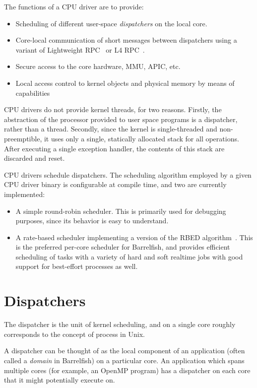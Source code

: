 \documentclass[a4paper,twoside]{report} %
\begin{document}
The functions of a CPU driver are to provide:
\begin{itemize}
\item Scheduling of different user-space \textit{dispatchers} on the
  local core.
\item Core-local communication of short messages between dispatchers
  using a variant of Lightweight RPC~\cite{lrpc:tocs90} or L4
  RPC~\cite{Liedtke:1993:IIK:168619.168633}. 
\item Secure access to the core hardware, MMU, APIC, etc.
\item Local access control to kernel objects and physical memory by
  means of capabilities
\end{itemize}

CPU drivers do not provide kernel threads, for two reasons.  Firstly,
the abstraction of the processor provided to user space programs is a
dispatcher, rather than a thread.  Secondly, since the kernel is
single-threaded and non-preemptible, it uses only a single, statically
allocated stack for all operations. After executing a single exception
handler, the contents of this stack are discarded and reset. 

CPU drivers schedule dispatchers.  The scheduling algorithm employed
by a given CPU driver binary is configurable at compile time, and two
are currently implemented:
\begin{itemize}
\item A simple round-robin scheduler.  This is primarily used for
  debugging purposes, since its behavior is easy to understand.
\item A rate-based scheduler implementing a version of the RBED
  algorithm~\cite{Brandt:2003:DIS:956418.956606}. This is the
  preferred per-core scheduler for Barrelfish, and provides efficient
  scheduling of tasks with a variety of hard and soft realtime jobs
  with good support for best-effort processes as well. 
\end{itemize}

\section{Dispatchers}

The dispatcher is the unit of kernel scheduling, and on a single core
roughly corresponds to the concept of process in Unix.  

A dispatcher can be thought of as the local component of an
application (often called a \textit{domain} in Barrelfish) on a
particular core.  An application which spans multiple cores (for
example, an OpenMP program) has a dispatcher on each core that it
might potentially execute on.  
\end{document}
